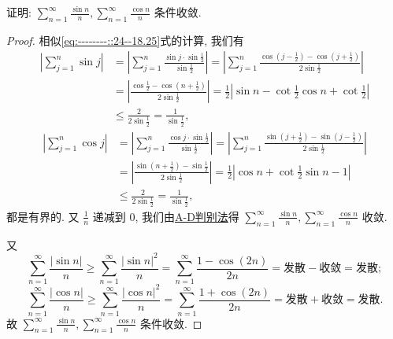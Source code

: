 \documentclass[../../main.tex]{subfiles}
\begin{document}
\begin{example}
证明: $\sum_{n=1}^{\infty} \frac{\sin n}{n}, \sum_{n=1}^{\infty} \frac{\cos n}{n}$ 条件收敛.
\end{example}
\begin{proof}
相似\eqref{eq:--------::24--18.25}式的计算, 我们有
\begin{align*}
\left| \sum_{j=1}^n{\sin j} \right|&=\left| \sum_{j=1}^n{\frac{\sin j\cdot \sin \frac{1}{2}}{\sin \frac{1}{2}}} \right|=\left| \sum_{j=1}^n{\frac{\cos \left( j-\frac{1}{2} \right) -\cos \left( j+\frac{1}{2} \right)}{2\sin \frac{1}{2}}} \right|
\\
&=\left| \frac{\cos \frac{1}{2}-\cos \left( n+\frac{1}{2} \right)}{2\sin \frac{1}{2}} \right|=\frac{1}{2}\left| \sin n-\cot \frac{1}{2}\cos n+\cot \frac{1}{2} \right|
\\
&\leqslant \frac{2}{2\sin \frac{1}{2}}=\frac{1}{\sin \frac{1}{2}},
\end{align*}
\begin{align*}
\left| \sum_{j=1}^n{\cos j} \right|&=\left| \sum_{j=1}^n{\frac{\cos j\cdot \sin \frac{1}{2}}{\sin \frac{1}{2}}} \right|=\left| \sum_{j=1}^n{\frac{\sin \left( j+\frac{1}{2} \right) -\sin \left( j-\frac{1}{2} \right)}{2\sin \frac{1}{2}}} \right|
\\
&=\left| \frac{\sin \left( n+\frac{1}{2} \right) -\sin \frac{1}{2}}{2\sin \frac{1}{2}} \right|=\frac{1}{2}\left| \cos n+\cot \frac{1}{2}\sin n-1 \right|
\\
&\leqslant \frac{2}{2\sin \frac{1}{2}}=\frac{1}{\sin \frac{1}{2}},
\end{align*}
都是有界的. 又 $\frac{1}{n}$ 递减到 0, 我们由\hyperref[theorem:A-D判别法]{A-D判别法}得 $\sum_{n=1}^{\infty} \frac{\sin n}{n}, \sum_{n=1}^{\infty} \frac{\cos n}{n}$ 收敛.

又
\[
\sum_{n=1}^{\infty} \frac{|\sin n|}{n} \geqslant \sum_{n=1}^{\infty} \frac{|\sin n|^2}{n} = \sum_{n=1}^{\infty} \frac{1 - \cos (2n)}{2n} = \text{发散} - \text{收敛} = \text{发散};
\]
\[
\sum_{n=1}^{\infty} \frac{|\cos n|}{n} \geqslant \sum_{n=1}^{\infty} \frac{|\cos n|^2}{n} = \sum_{n=1}^{\infty} \frac{1 + \cos (2n)}{2n} = \text{发散} + \text{收敛} = \text{发散}.
\]
故 $\sum_{n=1}^{\infty} \frac{\sin n}{n}, \sum_{n=1}^{\infty} \frac{\cos n}{n}$ 条件收敛.

\end{proof}
\end{document}

